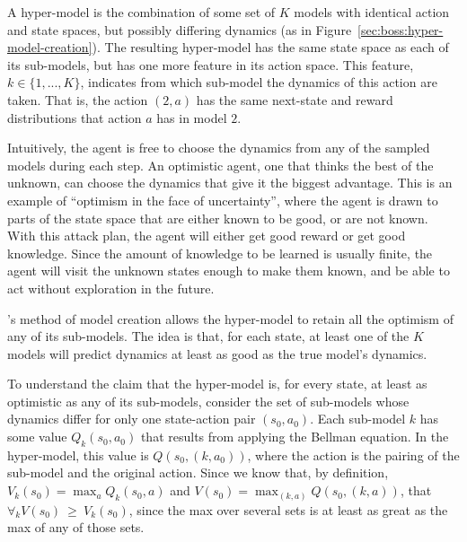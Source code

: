 A hyper-model is the combination of some set of $K$ models with identical action and state spaces, but possibly differing dynamics (as in Figure~\ref{sec:boss:hyper-model-creation}). The resulting hyper-model has the same state space as each of its sub-models, but has one more feature in its action space. This feature, $k\in\{1,...,K\}$, indicates from which sub-model the dynamics of this action are taken. That is, the action $(2, a)$ has the same next-state and reward distributions that action $a$ has in model $2$.

Intuitively, the agent is free to choose the dynamics from any of the sampled models during each step. An optimistic agent, one that thinks the best of the unknown, can choose the dynamics that give it the biggest advantage. This is an example of ``optimism in the face of uncertainty'', where the agent is drawn to parts of the state space that are either known to be good, or are not known. With this attack plan, the agent will either get good reward or get good knowledge. Since the amount of knowledge to be learned is usually finite, the agent will visit the unknown states enough to make them known, and be able to act without exploration in the future.

's method of model creation allows the hyper-model to retain all the optimism of any of its sub-models. The idea is that, for each state, at least one of the $K$ models will predict dynamics at least as good as the true model's dynamics.

To understand the claim that the hyper-model is, for every state, at least as optimistic as any of its sub-models, consider the set of sub-models whose dynamics differ for only one state-action pair $(s_0, a_0)$. Each sub-model $k$ has some value $Q_k(s_0,a_0)$ that results from applying the Bellman equation. In the hyper-model, this value is $Q(s_0,(k,a_0))$, where the action is the pairing of the sub-model and the original action. Since we know that, by definition, $V_k(s_0) = \max_a Q_k(s_0, a)$ and $V(s_0)=\max_{(k,a)} Q(s_0,(k,a))$, that $ \forall_k V(s_0)~\geq~V_k(s_0)$, since the max over several sets is at least as great as the max of any of those sets.



